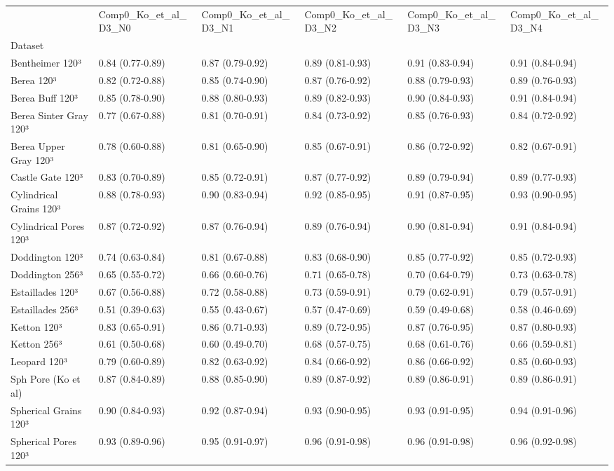 \begin{tabular}{llllll}
\toprule
 & Comp0_Ko_et_al_D3_N0 & Comp0_Ko_et_al_D3_N1 & Comp0_Ko_et_al_D3_N2 & Comp0_Ko_et_al_D3_N3 & Comp0_Ko_et_al_D3_N4 \\
Dataset &  &  &  &  &  \\
\midrule
Bentheimer 120³ & 0.84 (0.77-0.89) & 0.87 (0.79-0.92) & 0.89 (0.81-0.93) & 0.91 (0.83-0.94) & 0.91 (0.84-0.94) \\
Berea 120³ & 0.82 (0.72-0.88) & 0.85 (0.74-0.90) & 0.87 (0.76-0.92) & 0.88 (0.79-0.93) & 0.89 (0.76-0.93) \\
Berea Buff 120³ & 0.85 (0.78-0.90) & 0.88 (0.80-0.93) & 0.89 (0.82-0.93) & 0.90 (0.84-0.93) & 0.91 (0.84-0.94) \\
Berea Sinter Gray 120³ & 0.77 (0.67-0.88) & 0.81 (0.70-0.91) & 0.84 (0.73-0.92) & 0.85 (0.76-0.93) & 0.84 (0.72-0.92) \\
Berea Upper Gray 120³ & 0.78 (0.60-0.88) & 0.81 (0.65-0.90) & 0.85 (0.67-0.91) & 0.86 (0.72-0.92) & 0.82 (0.67-0.91) \\
Castle Gate 120³ & 0.83 (0.70-0.89) & 0.85 (0.72-0.91) & 0.87 (0.77-0.92) & 0.89 (0.79-0.94) & 0.89 (0.77-0.93) \\
Cylindrical Grains 120³ & 0.88 (0.78-0.93) & 0.90 (0.83-0.94) & 0.92 (0.85-0.95) & 0.91 (0.87-0.95) & 0.93 (0.90-0.95) \\
Cylindrical Pores 120³ & 0.87 (0.72-0.92) & 0.87 (0.76-0.94) & 0.89 (0.76-0.94) & 0.90 (0.81-0.94) & 0.91 (0.84-0.94) \\
Doddington 120³ & 0.74 (0.63-0.84) & 0.81 (0.67-0.88) & 0.83 (0.68-0.90) & 0.85 (0.77-0.92) & 0.85 (0.72-0.93) \\
Doddington 256³ & 0.65 (0.55-0.72) & 0.66 (0.60-0.76) & 0.71 (0.65-0.78) & 0.70 (0.64-0.79) & 0.73 (0.63-0.78) \\
Estaillades 120³ & 0.67 (0.56-0.88) & 0.72 (0.58-0.88) & 0.73 (0.59-0.91) & 0.79 (0.62-0.91) & 0.79 (0.57-0.91) \\
Estaillades 256³ & 0.51 (0.39-0.63) & 0.55 (0.43-0.67) & 0.57 (0.47-0.69) & 0.59 (0.49-0.68) & 0.58 (0.46-0.69) \\
Ketton 120³ & 0.83 (0.65-0.91) & 0.86 (0.71-0.93) & 0.89 (0.72-0.95) & 0.87 (0.76-0.95) & 0.87 (0.80-0.93) \\
Ketton 256³ & 0.61 (0.50-0.68) & 0.60 (0.49-0.70) & 0.68 (0.57-0.75) & 0.68 (0.61-0.76) & 0.66 (0.59-0.81) \\
Leopard 120³ & 0.79 (0.60-0.89) & 0.82 (0.63-0.92) & 0.84 (0.66-0.92) & 0.86 (0.66-0.92) & 0.85 (0.60-0.93) \\
Sph Pore (Ko et al) & 0.87 (0.84-0.89) & 0.88 (0.85-0.90) & 0.89 (0.87-0.92) & 0.89 (0.86-0.91) & 0.89 (0.86-0.91) \\
Spherical Grains 120³ & 0.90 (0.84-0.93) & 0.92 (0.87-0.94) & 0.93 (0.90-0.95) & 0.93 (0.91-0.95) & 0.94 (0.91-0.96) \\
Spherical Pores 120³ & 0.93 (0.89-0.96) & 0.95 (0.91-0.97) & 0.96 (0.91-0.98) & 0.96 (0.91-0.98) & 0.96 (0.92-0.98) \\
\bottomrule
\end{tabular}
